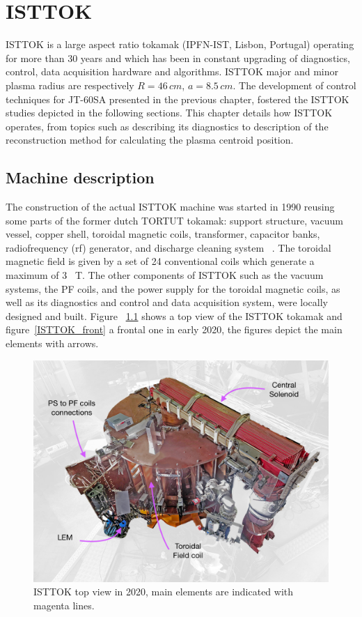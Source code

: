 \chapter{ISTTOK }

ISTTOK is a large aspect ratio tokamak (IPFN-IST, Lisbon, Portugal) operating for more than 30 years and which has been in constant upgrading of diagnostics, control, data acquisition hardware and  algorithms. ISTTOK major and minor plasma radius are respectively $R= 46 \, cm$, $a= 8.5 \, cm$. The development of control techniques for  JT-60SA presented in the previous chapter, fostered the  ISTTOK  studies  depicted in the following sections. This chapter details how ISTTOK operates, from topics such as describing its diagnostics to description of the reconstruction method for calculating the plasma centroid position.

\section{Machine description}

The construction  of the actual ISTTOK machine was started in 1990 reusing some parts of the former dutch TORTUT tokamak: support structure, vacuum vessel, copper shell, toroidal magnetic coils, transformer, capacitor banks, radiofrequency (rf) generator, and discharge cleaning system ~\cite{Varandas1996}. The toroidal magnetic field is given by a set of 24 conventional coils which generate a maximum of 3~ T. The other components of ISTTOK such as the vacuum systems, the PF coils, and the power supply for the toroidal magnetic coils,  as well as its diagnostics and control and data acquisition system, were locally designed and built. Figure ~\ref{TopISTTOK} shows a top view of the ISTTOK tokamak and figure~\ref{ISTTOK_front} a frontal one in early 2020, the figures depict the main elements with arrows.\smallskip

\begin{figure}[htbp]
	\centering
	\includegraphics[width=1.1\textwidth]{Chp4/TopISTTOK.png}
	\caption{\label{TopISTTOK} ISTTOK top view in 2020,   main elements are indicated with magenta  lines.}
\end{figure}

